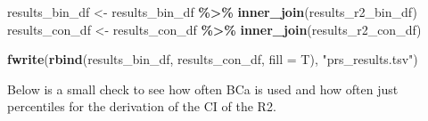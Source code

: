 \documentclass[
]{article}
\newenvironment{Shaded}{\begin{snugshade}}{\end{snugshade}}
\newcommand{\AttributeTok}[1]{\textcolor[rgb]{0.13,0.29,0.53}{#1}}
\newcommand{\FunctionTok}[1]{\textcolor[rgb]{0.13,0.29,0.53}{\textbf{#1}}}
\newcommand{\NormalTok}[1]{#1}
\newcommand{\OtherTok}[1]{\textcolor[rgb]{0.56,0.35,0.01}{#1}}
\newcommand{\SpecialCharTok}[1]{\textcolor[rgb]{0.81,0.36,0.00}{\textbf{#1}}}
\newcommand{\StringTok}[1]{\textcolor[rgb]{0.31,0.60,0.02}{#1}}
\begin{document}
\begin{Shaded}
\begin{Highlighting}[]
\NormalTok{results\_bin\_df }\OtherTok{\textless{}{-}}\NormalTok{ results\_bin\_df }\SpecialCharTok{\%\textgreater{}\%} \FunctionTok{inner\_join}\NormalTok{(results\_r2\_bin\_df)}
\NormalTok{results\_con\_df }\OtherTok{\textless{}{-}}\NormalTok{ results\_con\_df }\SpecialCharTok{\%\textgreater{}\%} \FunctionTok{inner\_join}\NormalTok{(results\_r2\_con\_df)}

\FunctionTok{fwrite}\NormalTok{(}\FunctionTok{rbind}\NormalTok{(results\_bin\_df, results\_con\_df, }\AttributeTok{fill =}\NormalTok{ T), }\StringTok{"prs\_results.tsv"}\NormalTok{)}
\end{Highlighting}
\end{Shaded}

Below is a small check to see how often BCa is used and how often just
percentiles for the derivation of the CI of the R2.
\end{document}
